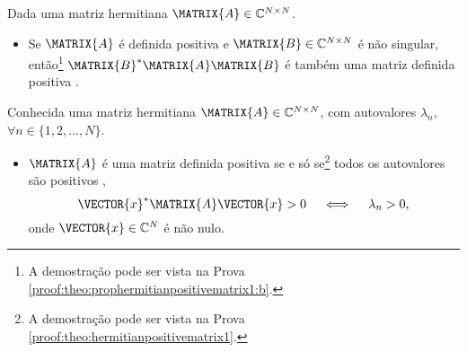 \begin{theorem}\label{theo:prophermitianpositivematrix1}
Dada uma matriz hermitiana $\MATRIX{A} \in \mathbb{C}^{N \times N}$.
\begin{itemize}
\item Se $\MATRIX{A}$ é definida positiva e 
$\MATRIX{B} \in \mathbb{C}^{N \times N}$ é não singular, então\footnote{A
demostração pode ser vista na Prova \ref{proof:theo:prophermitianpositivematrix1:b}.} 
$\MATRIX{B}^{\ast}\MATRIX{A}\MATRIX{B}$ é também uma matriz definida positiva \cite[pp. 64]{ipsen2009numerical}.
\end{itemize}
\end{theorem}

\begin{theorem}\label{theo:hermitianpositivematrix1}
Conhecida uma matriz hermitiana $\MATRIX{A} \in \mathbb{C}^{N \times N}$, com  autovalores $\lambda_n$,
$\forall n \in \{1, 2, ..., N\}$.
\begin{itemize}
\item $\MATRIX{A}$ é uma matriz definida positiva se e só se\footnote{A
demostração pode ser vista na Prova \ref{proof:theo:hermitianpositivematrix1}.}  
todos os autovalores são positivos \cite[pp. 309]{hartfiel2000matrix},
\begin{equation}
\VECTOR{x}^{\ast} \MATRIX{A} \VECTOR{x} > 0 \quad \iff \quad \lambda_n > 0,
\end{equation}
onde $\VECTOR{x} \in \mathbb{C}^{N}$ é não nulo.
\end{itemize}
\end{theorem}
